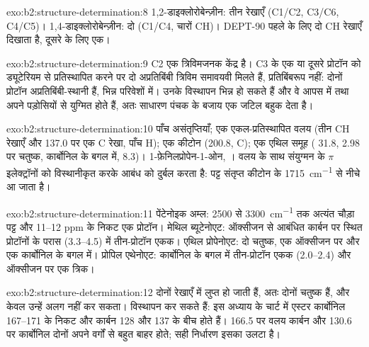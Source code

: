 \begin{solution}{exo:b2:structure-determination:8}
1,2-डाइक्लोरोबेन्ज़ीन: तीन रेखाएँ (C1/C2, C3/C6, C4/C5)। 1,4-डाइक्लोरोबेन्ज़ीन: दो (C1/C4, चारों
CH)। DEPT-90 पहले के लिए दो CH रेखाएँ दिखाता है, दूसरे के लिए एक।
\end{solution}

\begin{solution}{exo:b2:structure-determination:9}
C2 एक त्रिविमजनक केंद्र है। C3 के एक या दूसरे प्रोटॉन को ड्यूटेरियम से प्रतिस्थापित करने पर दो
अप्रतिबिंबी त्रिविम समावयवी मिलते हैं, प्रतिबिंबरूप नहीं: दोनों प्रोटॉन अप्रतिबिंबी-स्थानी हैं, भिन्न परिवेशों में।
उनके विस्थापन भिन्न हो सकते हैं और वे आपस में तथा अपने पड़ोसियों से युग्मित होते हैं, अतः
 साधारण पंचक के बजाय एक जटिल बहुक देता है।
\end{solution}

\begin{solution}{exo:b2:structure-determination:10}
पाँच असंतृप्तियाँ; एक एकल-प्रतिस्थापित वलय (तीन CH रेखाएँ और 137.0 पर एक C रेखा, पाँच 
H); एक कीटोन (200.8, C); एक एथिल समूह ( 31.8, 2.98 पर चतुष्क, कार्बोनिल के बगल में, 
8.3)। 1-फ़ेनिलप्रोपेन-1-ओन, । वलय के साथ संयुग्मन  के
$\pi$ इलेक्ट्रॉनों को विस्थानीकृत करके आबंध को दुर्बल करता है: पट्ट संतृप्त कीटोन के \qty{1715}{cm^{-1}} से नीचे आ जाता है।
\end{solution}

\begin{solution}{exo:b2:structure-determination:11}
पेंटेनोइक अम्ल: 2500 से \qty{3300}{cm^{-1}} तक अत्यंत चौड़ा  पट्ट और 11--12
ppm के निकट एक प्रोटॉन। मेथिल ब्यूटेनोएट: ऑक्सीजन से आबंधित कार्बन पर स्थित प्रोटॉनों के परास (3.3--4.5) में
तीन-प्रोटॉन एकक। एथिल प्रोपेनोएट: दो चतुष्क, एक ऑक्सीजन पर और एक कार्बोनिल के बगल में। प्रोपिल
एथेनोएट: कार्बोनिल के बगल में तीन-प्रोटॉन एकक (2.0--2.4) और ऑक्सीजन पर एक त्रिक।
\end{solution}

\begin{solution}{exo:b2:structure-determination:12}
दोनों रेखाएँ  में लुप्त हो जाती हैं, अतः दोनों चतुष्क हैं, और केवल  उन्हें अलग नहीं कर सकता। विस्थापन
कर सकते हैं: इस अध्याय के चार्ट में एस्टर कार्बोनिल 167--171 के निकट और  कार्बन 128 और 137 के बीच होते हैं।
166.5 पर वलय कार्बन और 130.6 पर कार्बोनिल दोनों अपने वर्गों से बहुत बाहर होते;
सही निर्धारण इसका उलटा है।
\end{solution}

